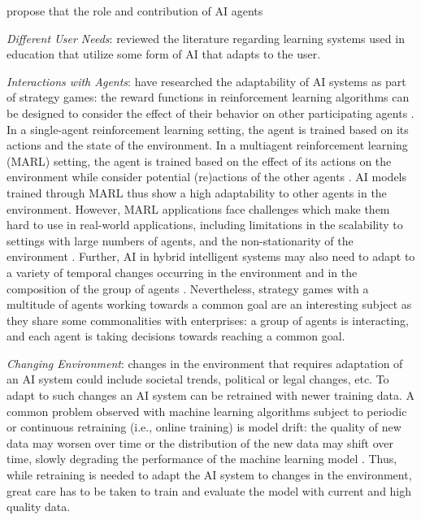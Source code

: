 \cite{hauptmanAdaptOvercomePerceptions2023} propose that the role and contribution of AI agents 


\textit{Different User Needs}:
\cite{kabudiAIenabledAdaptiveLearning2021} reviewed the literature regarding learning systems used in education
that utilize some form of AI that adapts to the user. 

\textit{Interactions with Agents}:
\cite{madeiraDesigningReinforcementLearningBased2006} have researched the adaptability of AI 
systems as part of strategy games: the reward functions in reinforcement learning algorithms can be designed to consider
the effect of their behavior on other participating agents \citep{madeiraDesigningReinforcementLearningBased2006}.
In a single-agent reinforcement learning setting, the agent is trained based on its actions and the state of the
environment. In a multiagent reinforcement learning (MARL) setting, the agent is trained based on the effect of its
actions on the environment while consider potential (re)actions of the other agents \citep{caneseMultiAgentReinforcementLearning2021}.
AI models trained through MARL thus show a high adaptability to other agents in the environment. However, MARL applications
face challenges which make them hard to use in real-world applications, including limitations in the scalability to settings
with large numbers of agents, and the non-stationarity of the environment \citep{caneseMultiAgentReinforcementLearning2021}. 
Further, AI in hybrid intelligent systems may also need to adapt to a variety of temporal changes occurring in the environment
and in the composition of the group of agents \citep{akataResearchAgendaHybrid2020}. Nevertheless, strategy games with a
multitude of agents working towards a common goal are an interesting subject as they share some commonalities with enterprises:
a group of agents is interacting, and each agent is taking decisions towards reaching a common goal.

\textit{Changing Environment}: changes in the environment that requires adaptation of an AI system could
include societal trends, political or legal changes, etc. To adapt to such changes an AI system can be retrained
with newer training data. A common problem
observed with machine learning algorithms subject to periodic or continuous retraining (i.e., online training)
is model drift: the quality of new data may worsen over time or the distribution of the new data may shift over
time, slowly degrading the performance of the machine learning model \citep{nelsonEvaluatingModelDrift2015}. Thus,
while retraining is needed to adapt the AI system to changes in the environment, great care has to be taken to 
train and evaluate the model with current and high quality data.   



